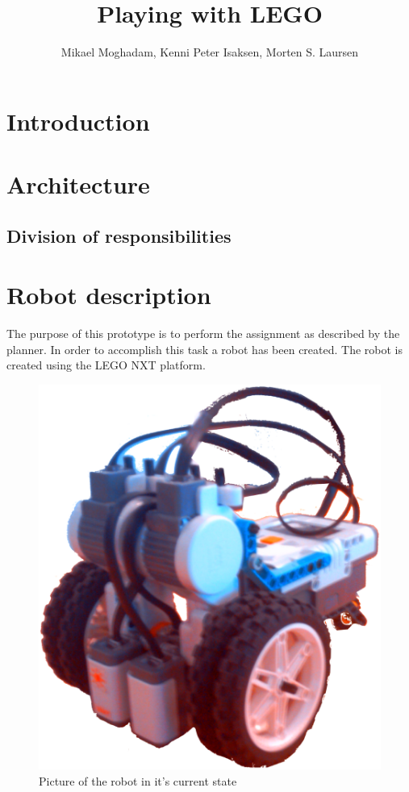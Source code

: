 \documentclass[draft, english, a4paper]{article}
\title{Playing with LEGO}
\author{Mikael Moghadam, Kenni Peter Isaksen, Morten S. Laursen}
\begin{document}
\maketitle %


%
%
\section{Introduction}
\newpage
\tableofcontents
\newpage
\section{Architecture}
	\subsection{Division of responsibilities}
	
\section{Robot description}
        The purpose of this prototype is to perform the assignment as described by
        the planner. In order to accomplish this task a robot 
        has been created. The robot is created using the LEGO NXT platform. 
        \begin{figure}[htp]
            \centering
    	    \includegraphics[scale=0.1]{robot}
	        \caption{Picture of the robot in it's current state}\label{fig:robotPic}
        \end{figure} 
\end{document}
